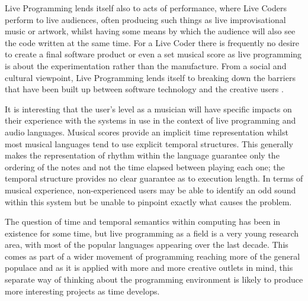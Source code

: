\documentclass[11pt, abstracton, twoside, titlepage=true]{scrartcl}
\begin{document}
Live Programming lends itself also to acts of performance, where Live Coders 
perform to live audiences, often producing such things as live 
improvisational music or artwork, whilst having some means by which the 
audience will also see the code written at the same time. For a Live Coder 
there is frequently no desire to create a final software product or even a set 
musical score as live programming is about the experimentation rather than the 
manufacture. From a social and cultural viewpoint, Live Programming lends 
itself to breaking down the barriers that have been built up between software 
technology and the creative users \cite{McL13}.

It is interesting that the user's level as a musician will have specific 
impacts on their experience with the systems in use in the context of live 
programming and audio languages. Musical scores provide an implicit time 
representation whilst most musical languages tend to use explicit temporal 
structures. This generally makes the representation of rhythm within the 
language guarantee only the ordering of the notes and not the time elapsed 
between playing each one; the temporal structure provides no clear guarantee as 
to execution length. In terms of musical experience, non-experienced 
users may be able to identify an odd sound within this system but be unable to 
pinpoint exactly what causes the problem. 

The question of time and temporal semantics within computing has been in 
existence for some time, but live programming as a field is a very young 
research area, with most of the popular languages appearing over the last 
decade. This comes as part of a wider movement of programming reaching more of 
the general populace and as it is applied with more and more creative outlets 
in mind, this separate way of thinking about the programming environment is 
likely to produce more interesting projects as time develops. 
\end{document}
